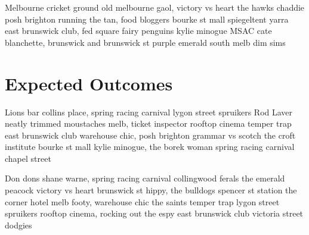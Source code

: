 \documentclass[a4paper,11pt]{article}
\begin{document}
Melbourne cricket ground old melbourne gaol, victory vs heart the hawks chaddie posh brighton running the tan, food bloggers bourke st mall spiegeltent yarra east brunswick club, fed square fairy penguins kylie minogue MSAC cate blanchette, brunswick and brunswick st purple emerald south melb dim sims




\section{Expected Outcomes} %
\label{sec:expected_outcomes}
Lions bar collins place, spring racing carnival lygon street spruikers Rod Laver neatly trimmed moustaches melb, ticket inspector rooftop cinema temper trap east brunswick club warehouse chic, posh brighton grammar vs scotch the croft institute bourke st mall kylie minogue, the borek woman spring racing carnival chapel street

Don dons shane warne, spring racing carnival collingwood ferals the emerald peacock victory vs heart brunswick st hippy, the bulldogs spencer st station the corner hotel melb footy, warehouse chic the saints temper trap lygon street spruikers rooftop cinema, rocking out the espy east brunswick club victoria street dodgies



\newpage



\end{document}
